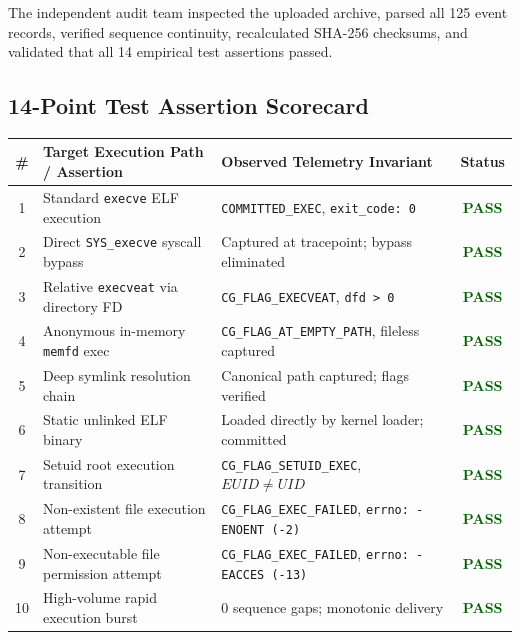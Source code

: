 \documentclass[11pt,a4paper]{article}
\begin{document}
\begin{auditbox}
The independent audit team inspected the uploaded archive, parsed all 125 event records, verified sequence continuity, recalculated SHA-256 checksums, and validated that all 14 empirical test assertions passed.
\end{auditbox}

\subsection{14-Point Test Assertion Scorecard}
\begin{table}[H]
\centering
\small
\begin{tabularx}{\textwidth}{c >{\raggedright\arraybackslash}p{4.2cm} X c}
\toprule
\textbf{\#} & \textbf{Target Execution Path / Assertion} & \textbf{Observed Telemetry Invariant} & \textbf{Status} \\
\midrule
1  & Standard \texttt{execve} ELF execution & \texttt{COMMITTED\_EXEC}, \texttt{exit\_code: 0} & \textbf{\textcolor{darkgreen}{PASS}} \\
2  & Direct \texttt{SYS\_execve} syscall bypass & Captured at tracepoint; bypass eliminated & \textbf{\textcolor{darkgreen}{PASS}} \\
3  & Relative \texttt{execveat} via directory FD & \texttt{CG\_FLAG\_EXECVEAT}, \texttt{dfd > 0} & \textbf{\textcolor{darkgreen}{PASS}} \\
4  & Anonymous in-memory \texttt{memfd} exec & \texttt{CG\_FLAG\_AT\_EMPTY\_PATH}, fileless captured & \textbf{\textcolor{darkgreen}{PASS}} \\
5  & Deep symlink resolution chain & Canonical path captured; flags verified & \textbf{\textcolor{darkgreen}{PASS}} \\
6  & Static unlinked ELF binary & Loaded directly by kernel loader; committed & \textbf{\textcolor{darkgreen}{PASS}} \\
7  & Setuid root execution transition & \texttt{CG\_FLAG\_SETUID\_EXEC}, $EUID \neq UID$ & \textbf{\textcolor{darkgreen}{PASS}} \\
8  & Non-existent file execution attempt & \texttt{CG\_FLAG\_EXEC\_FAILED}, \texttt{errno: -ENOENT (-2)} & \textbf{\textcolor{darkgreen}{PASS}} \\
9  & Non-executable file permission attempt & \texttt{CG\_FLAG\_EXEC\_FAILED}, \texttt{errno: -EACCES (-13)} & \textbf{\textcolor{darkgreen}{PASS}} \\
10 & High-volume rapid execution burst & 0 sequence gaps; monotonic delivery & \textbf{\textcolor{darkgreen}{PASS}} \\

\end{tabularx}
\end{table}
\end{document}
